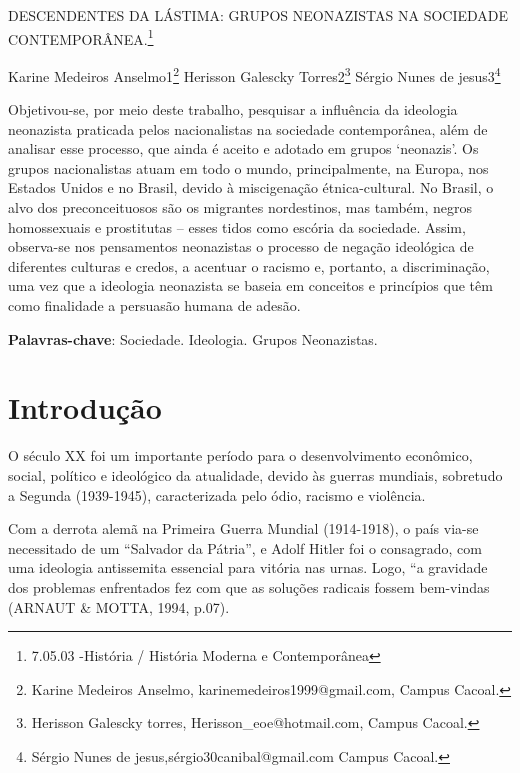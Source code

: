 \documentclass[article,12pt,onesidea,4paper,english,brazil]{abntex2}
\begin{document}
	
	
	\frenchspacing 
	
	\begin{center}
		\LARGE DESCENDENTES DA LÁSTIMA:
		GRUPOS NEONAZISTAS NA SOCIEDADE CONTEMPORÂNEA.\footnote{ 7.05.03 -História / História Moderna e Contemporânea}
		
		\normalsize
	Karine Medeiros Anselmo1\footnote{Karine Medeiros Anselmo, karinemedeiros1999@gmail.com, Campus Cacoal.} 
	Herisson Galescky Torres2\footnote{Herisson Galescky torres, Herisson\_eoe@hotmail.com, Campus Cacoal.} 
	Sérgio Nunes de jesus3\footnote{Sérgio Nunes de jesus,sérgio30canibal@gmail.com Campus Cacoal.} 
	\end{center}
	
	\begin{resumoumacoluna}
		Objetivou-se, por meio deste trabalho, pesquisar a influência da ideologia neonazista praticada pelos nacionalistas na sociedade contemporânea, além de analisar esse processo, que ainda é aceito e adotado em grupos ‘neonazis’. Os grupos nacionalistas atuam em todo o mundo, principalmente, na Europa, nos Estados Unidos e no Brasil, devido à miscigenação étnica-cultural. No Brasil, o alvo dos preconceituosos são os migrantes nordestinos, mas também, negros homossexuais e prostitutas – esses tidos como escória da sociedade. Assim, observa-se nos pensamentos neonazistas o processo de negação ideológica de diferentes culturas e credos, a acentuar o racismo e, portanto, a discriminação, uma vez que a ideologia neonazista se baseia em conceitos e princípios que têm como finalidade a persuasão humana de adesão.
		
		\vspace{\onelineskip}
		
		\noindent
		\textbf{Palavras-chave}: Sociedade. Ideologia. Grupos Neonazistas.
	\end{resumoumacoluna}
	
	\section*{Introdução}
	
O século XX foi um importante período para o desenvolvimento econômico, social, político e ideológico da atualidade, devido às guerras mundiais, sobretudo a Segunda (1939-1945), caracterizada pelo ódio, racismo e violência.

Com a derrota alemã na Primeira Guerra Mundial (1914-1918), o país via-se necessitado de um “Salvador da Pátria”, e Adolf Hitler foi o consagrado, com uma ideologia antissemita essencial para vitória nas urnas. Logo, “a gravidade dos problemas enfrentados fez com que as soluções radicais fossem bem-vindas (ARNAUT \& MOTTA, 1994, p.07).
\end{document}
